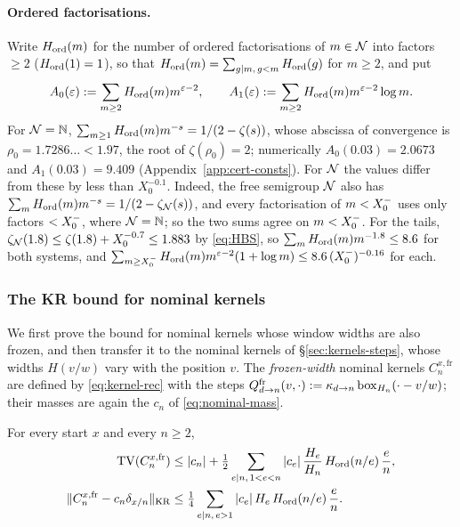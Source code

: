 \paragraph{Ordered factorisations.} Write $H_{\mathrm{ord}}(m)$ for the number of ordered factorisations of $m\in\mathcal{N}$ into factors
$\ge2$ ($H_{\mathrm{ord}}(1)=1$), so that $H_{\mathrm{ord}}(m)=\sum_{g\mid m,\,g<m}H_{\mathrm{ord}}(g)$ for $m\ge2$, and put
\[
  A_0(\varepsilon):=\sum_{m\ge2}H_{\mathrm{ord}}(m)m^{\varepsilon-2},\qquad A_1(\varepsilon):=\sum_{m\ge2}H_{\mathrm{ord}}(m)m^{\varepsilon-2}\log m .
\]
For $\mathcal{N}=\mathbb{N}$, $\sum_{m\ge1}H_{\mathrm{ord}}(m)m^{-s}=1/(2-\zeta(s))$, whose abscissa of convergence is $\rho_0=1.7286\ldots<1.97$, the
root of $\zeta(\rho_0)=2$; numerically $A_0(0.03)=2.0673$ and $A_1(0.03)=9.409$ (Appendix~\ref{app:cert-consts}). For $\mathcal{N}$ the values differ from these
by less than $X_0^{-0.1}$. Indeed, the free semigroup $\mathcal{N}$ also has $\sum_mH_{\mathrm{ord}}(m)m^{-s}=1/(2-\zeta_{\mathcal{N}}(s))$, and every
factorisation of $m<X_0^{-}$ uses only factors $<X_0^{-}$, where $\mathcal{N}=\mathbb{N}$; so the two sums agree on $m<X_0^{-}$. For the tails,
$\zeta_{\mathcal{N}}(1.8)\le\zeta(1.8)+X_0^{-0.7}\le1.883$ by \eqref{eq:HBS}, so $\sum_mH_{\mathrm{ord}}(m)m^{-1.8}\le8.6$ for both systems, and
$\sum_{m\ge X_0^{-}}H_{\mathrm{ord}}(m)m^{\varepsilon-2}(1+\log m)\le8.6\,(X_0^{-})^{-0.16}$ for each.

\subsubsection{The KR bound for nominal kernels}\label{sec:kr-bound}

We first prove the bound for nominal kernels whose window widths are also frozen, and then transfer it to the nominal
kernels of \S\ref{sec:kernels-steps}, whose widths $H(v/w)$ vary with the position $v$. The \emph{frozen-width} nominal
kernels $C_n^{x,\mathrm{fr}}$ are defined by \eqref{eq:kernel-rec} with the steps
$Q^{\mathrm{fr}}_{d\to n}(v,\cdot):=\kappa_{d\to n}\,\mathrm{box}_{H_n}(\cdot-v/w)$; their masses are again the $c_n$ of
\eqref{eq:nominal-mass}.

\begin{theorem}\label{thm:kr}
For every start $x$ and every $n\ge2$,
\begin{align*}
  \operatorname{TV}(C_n^{x,\mathrm{fr}})&\le|c_n|+\tfrac12\sum_{e\mid n,\,1<e<n}|c_e|\,\frac{H_e}{H_n}\,H_{\mathrm{ord}}(n/e)\,\frac en,\\
  \lVert C_n^{x,\mathrm{fr}}-c_n\delta_{x/n}\rVert_{\mathrm{KR}}&\le\tfrac14\sum_{e\mid n,\,e>1}|c_e|\,H_e\,H_{\mathrm{ord}}(n/e)\,\frac en .
\end{align*}
\end{theorem}

